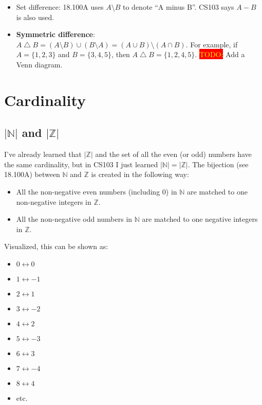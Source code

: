\documentclass[12pt, letterpaper, oneside]{book}
\begin{document}
\begin{itemize}
  \item Set difference: 18.100A uses $A \setminus B$ to denote ``A minus B''.
        CS103 says $A - B$ is also used.
  \item \textbf{Symmetric difference}: $A \bigtriangleup B = (A \setminus B)
          \cup (B \setminus A) = (A \cup B) \setminus (A \cap B)$. For example, if
        $A = \{1, 2, 3\}$ and $B = \{3, 4, 5\}$, then $A \bigtriangleup B = \{1, 2,
          4, 5\}$. \colorbox{red}{\textcolor{yellow}{TODO:}} Add a Venn diagram.
\end{itemize}

\section{Cardinality}

\subsection{$|\mathbb{N}|$ and $|\mathbb{Z}|$}

I've already learned that $|\mathbb{Z}|$ and the set of all the even (or odd)
numbers have the same cardinality, but in CS103 I just learned $|\mathbb{N}| =
  |\mathbb{Z}|$. The bijection (see 18.100A) between $\mathbb{N}$ and $\mathbb{Z}$
is created in the following way:
\begin{itemize}
  \item All the non-negative even numbers (including $0$) in $\mathbb{N}$ are
        matched to one non-negative integers in $\mathbb{Z}$.
  \item All the non-negative odd numbers in $\mathbb{N}$ are matched to one
        negative integers in $\mathbb{Z}$.
\end{itemize}

Visualized, this can be shown as:
\begin{itemize}
  \item $0 \longleftrightarrow 0$
  \item $1 \longleftrightarrow -1$
  \item $2 \longleftrightarrow 1$
  \item $3 \longleftrightarrow -2$
  \item $4 \longleftrightarrow 2$
  \item $5 \longleftrightarrow -3$
  \item $6 \longleftrightarrow 3$
  \item $7 \longleftrightarrow -4$
  \item $8 \longleftrightarrow 4$
  \item etc.
\end{itemize}
\end{document}
